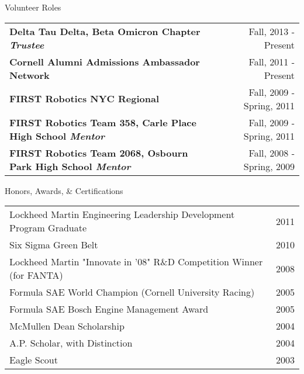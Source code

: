 \documentclass{resume} %
\begin{document}

\begin{rSection}{Volunteer Roles}
    \begin{tabular}{ @{} >{\bfseries}l @{\hspace{6ex}}r }
    Delta Tau Delta, Beta Omicron Chapter \textit{Trustee} & Fall, 2013 - Present \\
    Cornell Alumni Admissions Ambassador Network & Fall, 2011 - Present \\
    FIRST Robotics NYC Regional & Fall, 2009 - Spring, 2011 \\
    FIRST Robotics Team 358, Carle Place High School \textit{Mentor} & Fall, 2009 - Spring, 2011 \\
    FIRST Robotics Team 2068, Osbourn Park High School \textit{Mentor} & Fall, 2008 - Spring, 2009 \\
    \end{tabular}
\end{rSection}



\begin{rSection}{Honors, Awards, \& Certifications}
\begin{tabular}{ @{} >{}l @{\hspace{18ex}} r }
Lockheed Martin Engineering Leadership Development Program Graduate & 2011\\
Six Sigma Green Belt & 2010 \\
Lockheed Martin "Innovate in '08" R\&D Competition Winner (for FANTA) & 2008 \\
Formula SAE World Champion (Cornell University Racing) & 2005 \\
Formula SAE Bosch Engine Management Award & 2005 \\
McMullen Dean Scholarship & 2004 \\
A.P. Scholar, with Distinction & 2004 \\
Eagle Scout & 2003
\end{tabular}

\end{rSection}

\end{document}
